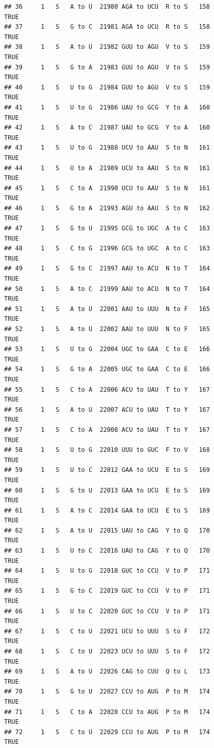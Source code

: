 \documentclass[
  12pt,
]{article}
\begin{document}
\begin{verbatim}
## 36     1   S   A to U  21980 AGA to UCU  R to S   158           TRUE
## 37     1   S   G to C  21981 AGA to UCU  R to S   158           TRUE
## 38     1   S   A to U  21982 GUU to AGU  V to S   159           TRUE
## 39     1   S   G to A  21983 GUU to AGU  V to S   159           TRUE
## 40     1   S   U to G  21984 GUU to AGU  V to S   159           TRUE
## 41     1   S   U to G  21986 UAU to GCG  Y to A   160           TRUE
## 42     1   S   A to C  21987 UAU to GCG  Y to A   160           TRUE
## 43     1   S   U to G  21988 UCU to AAU  S to N   161           TRUE
## 44     1   S   U to A  21989 UCU to AAU  S to N   161           TRUE
## 45     1   S   C to A  21990 UCU to AAU  S to N   161           TRUE
## 46     1   S   G to A  21993 AGU to AAU  S to N   162           TRUE
## 47     1   S   G to U  21995 GCG to UGC  A to C   163           TRUE
## 48     1   S   C to G  21996 GCG to UGC  A to C   163           TRUE
## 49     1   S   G to C  21997 AAU to ACU  N to T   164           TRUE
## 50     1   S   A to C  21999 AAU to ACU  N to T   164           TRUE
## 51     1   S   A to U  22001 AAU to UUU  N to F   165           TRUE
## 52     1   S   A to U  22002 AAU to UUU  N to F   165           TRUE
## 53     1   S   U to G  22004 UGC to GAA  C to E   166           TRUE
## 54     1   S   G to A  22005 UGC to GAA  C to E   166           TRUE
## 55     1   S   C to A  22006 ACU to UAU  T to Y   167           TRUE
## 56     1   S   A to U  22007 ACU to UAU  T to Y   167           TRUE
## 57     1   S   C to A  22008 ACU to UAU  T to Y   167           TRUE
## 58     1   S   U to G  22010 UUU to GUC  F to V   168           TRUE
## 59     1   S   U to C  22012 GAA to UCU  E to S   169           TRUE
## 60     1   S   G to U  22013 GAA to UCU  E to S   169           TRUE
## 61     1   S   A to C  22014 GAA to UCU  E to S   169           TRUE
## 62     1   S   A to U  22015 UAU to CAG  Y to Q   170           TRUE
## 63     1   S   U to C  22016 UAU to CAG  Y to Q   170           TRUE
## 64     1   S   U to G  22018 GUC to CCU  V to P   171           TRUE
## 65     1   S   G to C  22019 GUC to CCU  V to P   171           TRUE
## 66     1   S   U to C  22020 GUC to CCU  V to P   171           TRUE
## 67     1   S   C to U  22021 UCU to UUU  S to F   172           TRUE
## 68     1   S   C to U  22023 UCU to UUU  S to F   172           TRUE
## 69     1   S   A to U  22026 CAG to CUU  Q to L   173           TRUE
## 70     1   S   G to U  22027 CCU to AUG  P to M   174           TRUE
## 71     1   S   C to A  22028 CCU to AUG  P to M   174           TRUE
## 72     1   S   C to U  22029 CCU to AUG  P to M   174           TRUE

\end{verbatim}
\end{document}

